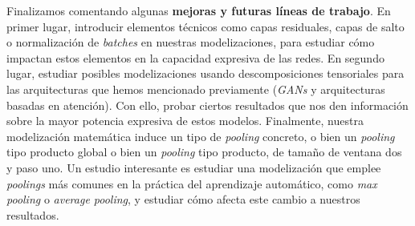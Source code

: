 Finalizamos comentando algunas \textbf{mejoras y futuras líneas de trabajo}. En primer lugar, introducir elementos técnicos como capas residuales, capas de salto o normalización de \textit{batches} en nuestras modelizaciones, para estudiar cómo impactan estos elementos en la capacidad expresiva de las redes. En segundo lugar, estudiar posibles modelizaciones usando descomposiciones tensoriales para las arquitecturas que hemos mencionado previamente (\textit{GANs} y arquitecturas basadas en atención). Con ello, probar ciertos resultados que nos den información sobre la mayor potencia expresiva de estos modelos. Finalmente, nuestra modelización matemática induce un tipo de \textit{pooling} concreto, o bien un \textit{pooling} tipo producto global o bien un \textit{pooling} tipo producto, de tamaño de ventana dos y paso uno. Un estudio interesante es estudiar una modelización que emplee \textit{poolings} más comunes en la práctica del aprendizaje automático, como \textit{max pooling} o \textit{average pooling}, y estudiar cómo afecta este cambio a nuestros resultados.
